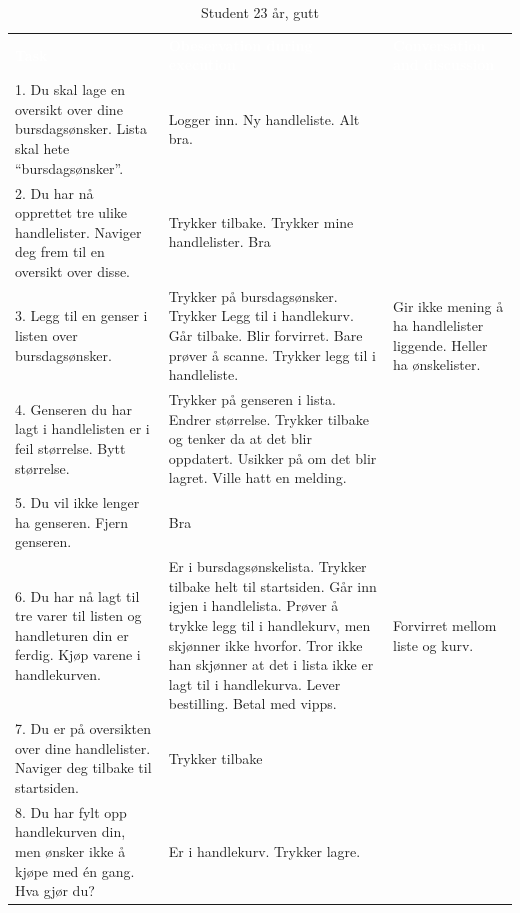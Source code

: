 \begin{table}[H]
    \caption{Student 23 år, gutt}
    \label{tab:observasjon1_4}
    \centering
    \begin{tabular}{|L{15em}  L{15em} L{15em}|}
    \hline
        \textbf{\textcolor{white}{Task}} & \textbf{\textcolor{white}{Obeservation during execution}} & \textbf{\textcolor{white}{Conversation and discussion}}\\
        1. Du skal lage en oversikt over dine bursdagsønsker. Lista skal hete “bursdagsønsker”. & Logger inn. Ny handleliste. Alt bra. & \\
        2. Du har nå opprettet tre ulike handlelister. Naviger deg frem til en oversikt over disse. & Trykker tilbake. Trykker mine handlelister. Bra &  \\
        3. Legg til en genser i listen over bursdagsønsker. & Trykker på bursdagsønsker. Trykker Legg til i handlekurv. Går tilbake. Blir forvirret. Bare prøver å scanne. Trykker legg til i handleliste. & Gir ikke mening å ha handlelister liggende. Heller ha ønskelister.\\
        4. Genseren du har lagt i handlelisten er i feil størrelse. Bytt størrelse. & Trykker på genseren i lista. Endrer størrelse. Trykker tilbake og tenker da at det blir oppdatert. Usikker på om det blir lagret. Ville hatt en melding. & \\
        5. Du vil ikke lenger ha genseren. Fjern genseren. & Bra & \\
        6. Du har nå lagt til tre varer til listen og handleturen din er ferdig. Kjøp varene i handlekurven. & Er i bursdagsønskelista. Trykker tilbake helt til startsiden. Går inn igjen i handlelista. Prøver å trykke legg til i handlekurv, men skjønner ikke hvorfor. Tror ikke han skjønner at det i lista ikke er lagt til i handlekurva. Lever bestilling. Betal med vipps. & Forvirret mellom liste og kurv.\\
        7. Du er på oversikten over dine handlelister. Naviger deg tilbake til startsiden. & Trykker tilbake & \\
        8. Du har fylt opp handlekurven din, men ønsker ikke å kjøpe med én gang. Hva gjør du? & Er i handlekurv. Trykker lagre. & \\
        \hline
    \end{tabular}
\end{table}

